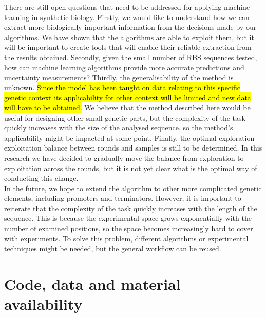 \documentclass{article}
\begin{document}
There are still open questions that need to be addressed for applying machine learning in synthetic biology.
Firstly, we would like to understand how we can extract more biologically-important information from the decisions made by our algorithms.
We have shown that the algorithms are able to exploit them, but it will be important to create tools that will enable their reliable extraction from the results obtained.
Secondly, given the small number of RBS sequences tested, how can machine learning algorithms provide more accurate predictions and uncertainty measurements? 
Thirdly, the generalisability of the method is unknown.
\hl{Since the model has been taught on data relating to this specific genetic context its applicability for other context will be limited and new data will have to be obtained.}
We believe that the method described here would be useful for designing other small genetic parts, but the complexity of the task quickly increases with the size of the analysed sequence, so the method's applicability might be impacted at some point.
Finally, the optimal exploration-exploitation balance between rounds and samples is still to be determined.
In this research we have decided to gradually move the balance from exploration to exploitation across the rounds, but it is not yet clear what is the optimal way of conducting this change.\\

In the future, we hope to extend the algorithm to other more complicated genetic elements, including promoters and terminators.
However, it is important to reiterate that the complexity of the task quickly increases with the length of the sequence.
This is because the experimental space grows exponentially with the number of examined positions, so the space becomes increasingly hard to cover with experiments.
To solve this problem, different algorithms or experimental techniques might be needed, but the general workflow can be reused.\\



\section*{Code, data and material availability}
\end{document}
